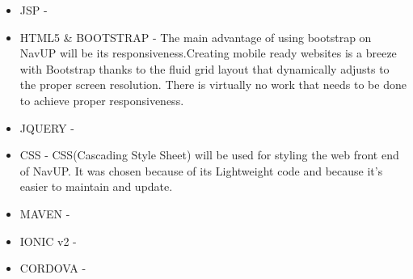 \begin{itemize}
	\item JSP - 
	
	\item HTML5 \& BOOTSTRAP - The main advantage of using bootstrap on NavUP will be its responsiveness.Creating mobile ready websites is a breeze with Bootstrap thanks to the fluid grid layout that dynamically adjusts to the proper screen resolution. There is virtually no work that needs to be done to achieve proper responsiveness.
	
	\item JQUERY - 
	
	\item CSS - CSS(Cascading Style Sheet) will be used for styling the web front end of NavUP. It was chosen because of its Lightweight code and because it's easier to maintain and update. 
	
	\item MAVEN - 
	
	
	
	\item IONIC v2 - 
	
	\item CORDOVA - 
	
	
	
\end{itemize}
